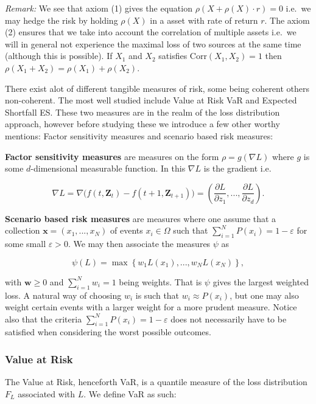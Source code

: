 \documentclass[
]{book}
\begin{document}
\emph{Remark:} We see that axiom (1) gives the equation \(\rho(X+\rho(X)\cdot r)=0\) i.e.~we may hedge the risk by holding \(\rho(X)\) in a asset with rate of return \(r\). The axiom (2) ensures that we take into account the correlation of multiple assets i.e.~we will in general not experience the maximal loss of two sources at the same time (although this is possible). If \(X_1\) and \(X_2\) satisfies \(\text{Corr}(X_1,X_2)=1\) then \(\rho(X_1+X_2)= \rho(X_1)+\rho(X_2)\).

There exist alot of different tangible measures of risk, some being coherent others non-coherent. The most well studied include Value at Risk VaR and Expected Shortfall ES. These two measures are in the realm of the loss distribution approach, however before studying these we introduce a few other worthy mentions: Factor sensitivity measures and scenario based risk measures:

\textbf{Factor sensitivity measures} are measures on the form \(\rho=g(\nabla L)\) where \(g\) is some \(d\)-dimensional measurable function. In this \(\nabla L\) is the gradient i.e.

\[
\nabla L=\nabla \Big(f(t,\mathbf{Z}_t)-f(t+1,\mathbf{Z}_{t+1})\Big)=\left(\frac{\partial L}{\partial z_1},...,\frac{\partial L}{\partial z_d}\right).
\]

\textbf{Scenario based risk measures} are measures where one assume that a collection \(\mathbf{x}=(x_1,...,x_N)\) of events \(x_i\in \Omega\) such that \(\sum_{i=1}^N P(x_i)=1-\varepsilon\) for some small \(\varepsilon>0\). We may then associate the measures \(\psi\) as

\[
\psi(L)=\max\left\{w_1L(x_1),...,w_NL(x_N)\right\},
\]

with \(\mathbf{w}\ge 0\) and \(\sum_{i=1}^Nw_i=1\) being weights. That is \(\psi\) gives the largest weighted loss. A natural way of choosing \(w_i\) is such that \(w_i\approx P(x_i)\), but one may also weight certain events with a larger weight for a more prudent measure. Notice also that the criteria \(\sum_{i=1}^N P(x_i)=1-\varepsilon\) does not necessarily have to be satisfied when considering the worst possible outcomes.

\hypertarget{value-at-risk}{%
\subsubsection{Value at Risk}\label{value-at-risk}}

The Value at Risk, henceforth VaR, is a quantile measure of the loss distribution \(F_L\) associated with \(L\). We define VaR as such:
\end{document}
